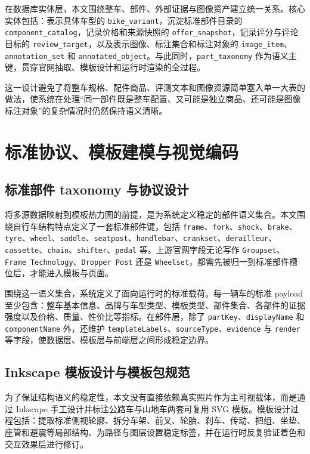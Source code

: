 \documentclass[12pt,hyperref,a4paper,UTF8]{ctexart}
\begin{document}
在数据库实体层，本文围绕整车、部件、外部证据与图像资产建立统一关系。核心实体包括：表示具体车型的 \texttt{bike\_variant}，沉淀标准部件目录的 \texttt{component\_catalog}，记录价格和来源快照的 \texttt{offer\_snapshot}，记录评分与评论目标的 \texttt{review\_target}，以及表示图像、标注集合和标注对象的 \texttt{image\_item}、\texttt{annotation\_set} 和 \texttt{annotated\_object}。与此同时，\texttt{part\_taxonomy} 作为语义主键，贯穿官网抽取、模板设计和运行时渲染的全过程。

这一设计避免了将整车规格、配件商品、评测文本和图像资源简单塞入单一大表的做法，使系统在处理“同一部件既是整车配置、又可能是独立商品、还可能是图像标注对象”的复杂情况时仍然保持语义清晰。

\section{标准协议、模板建模与视觉编码}

\subsection{标准部件 taxonomy 与协议设计}

将多源数据映射到模板热力图的前提，是为系统定义稳定的部件语义集合。本文围绕自行车结构特点定义了一套标准部件键，包括 \texttt{frame}、\texttt{fork}、\texttt{shock}、\texttt{brake}、\texttt{tyre}、\texttt{wheel}、\texttt{saddle}、\texttt{seatpost}、\texttt{handlebar}、\texttt{crankset}、\texttt{derailleur}、\texttt{cassette}、\texttt{chain}、\texttt{shifter}、\texttt{pedal} 等。上游官网字段无论写作 \texttt{Groupset}、\texttt{Frame Technology}、\texttt{Dropper Post} 还是 \texttt{Wheelset}，都需先被归一到标准部件槽位后，才能进入模板与页面。

围绕这一语义集合，系统定义了面向运行时的标准载荷。每一辆车的标准 payload 至少包含：整车基本信息、品牌与车型类型、模板类型、部件集合、各部件的证据强度以及价格、质量、性价比等指标。在部件层，除了 \texttt{partKey}、\texttt{displayName} 和 \texttt{componentName} 外，还维护 \texttt{templateLabels}、\texttt{sourceType}、\texttt{evidence} 与 \texttt{render} 等字段，使数据层、模板层与前端层之间形成稳定边界。

\subsection{Inkscape 模板设计与模板包规范}

为了保证结构语义的稳定性，本文没有直接依赖真实照片作为主可视载体，而是通过 Inkscape 手工设计并标注公路车与山地车两套可复用 SVG 模板。模板设计过程包括：提取标准侧视轮廓、拆分车架、前叉、轮胎、刹车、传动、把组、坐垫、座管和避震等局部结构、为路径与图层设置稳定标签，并在运行时反复验证着色和交互效果后进行修订。
\end{document}
